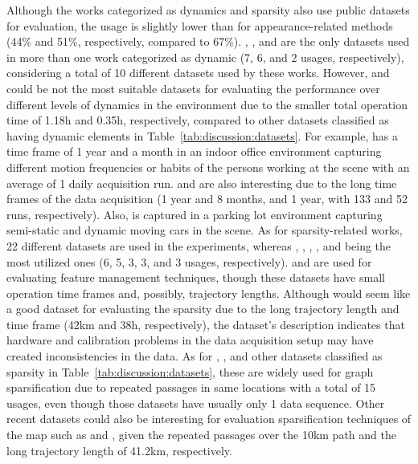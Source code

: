 Although the works categorized as dynamics and sparsity also use public datasets for evaluation, the usage is slightly lower than for appearance-related methods (44\% and 51\%, respectively, compared to 67\%).
, , and  are the only datasets used in more than one work categorized as dynamic (7, 6, and 2 usages, respectively), considering a total of 10 different datasets used by these works. However,  and  could be not the most suitable datasets for evaluating the performance over different levels of dynamics in the environment due to the smaller total operation time of 1.18h and 0.35h, respectively, compared to other datasets classified as having dynamic elements in Table~\ref{tab:discussion:datasets}. For example,  has a time frame of 1 year and a month in an indoor office environment capturing different motion frequencies or habits of the persons working at the scene with an average of 1 daily acquisition run.  and  are also interesting due to the long time frames of the data acquisition (1 year and 8 months, and 1 year, with 133 and 52 runs, respectively). Also,  is captured in a parking lot environment capturing semi-static and dynamic moving cars in the scene.
As for sparsity-related works, 22 different datasets are used in the experiments, whereas , , , , and  being the most utilized ones (6, 5, 3, 3, and 3 usages, respectively).  and  are used for evaluating feature management techniques, though these datasets have small operation time frames and, possibly, trajectory lengths. Although  would seem like a good dataset for evaluating the sparsity due to the long trajectory length and time frame (42km and 38h, respectively), the dataset's description indicates that hardware and calibration problems in the data acquisition setup may have created inconsistencies in the data. As for , , and other datasets classified as sparsity in Table~\ref{tab:discussion:datasets}, these are widely used for graph sparsification due to repeated passages in same locations with a total of 15 usages, even though those datasets have usually only 1 data sequence. Other recent datasets could also be interesting for evaluation sparsification techniques of the map such as  and , given the repeated passages over the 10km path and the long trajectory length of 41.2km, respectively.

